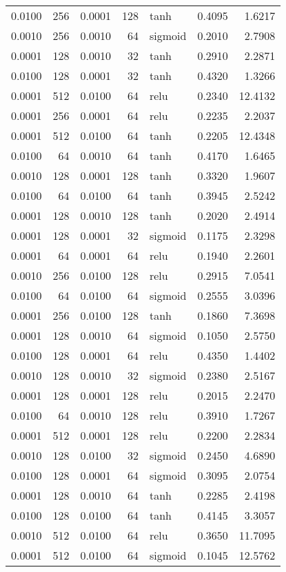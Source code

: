 \begin{table}
\begin{tabular}{rrrrlrr}
0.0100 & 256 & 0.0001 & 128 & tanh & 0.4095 & 1.6217 \\
0.0010 & 256 & 0.0010 & 64 & sigmoid & 0.2010 & 2.7908 \\
0.0001 & 128 & 0.0010 & 32 & tanh & 0.2910 & 2.2871 \\
0.0100 & 128 & 0.0001 & 32 & tanh & 0.4320 & 1.3266 \\
0.0001 & 512 & 0.0100 & 64 & relu & 0.2340 & 12.4132 \\
0.0001 & 256 & 0.0001 & 64 & relu & 0.2235 & 2.2037 \\
0.0001 & 512 & 0.0100 & 64 & tanh & 0.2205 & 12.4348 \\
0.0100 & 64 & 0.0010 & 64 & tanh & 0.4170 & 1.6465 \\
0.0010 & 128 & 0.0001 & 128 & tanh & 0.3320 & 1.9607 \\
0.0100 & 64 & 0.0100 & 64 & tanh & 0.3945 & 2.5242 \\
0.0001 & 128 & 0.0010 & 128 & tanh & 0.2020 & 2.4914 \\
0.0001 & 128 & 0.0001 & 32 & sigmoid & 0.1175 & 2.3298 \\
0.0001 & 64 & 0.0001 & 64 & relu & 0.1940 & 2.2601 \\
0.0010 & 256 & 0.0100 & 128 & relu & 0.2915 & 7.0541 \\
0.0100 & 64 & 0.0100 & 64 & sigmoid & 0.2555 & 3.0396 \\
0.0001 & 256 & 0.0100 & 128 & tanh & 0.1860 & 7.3698 \\
0.0001 & 128 & 0.0010 & 64 & sigmoid & 0.1050 & 2.5750 \\
0.0100 & 128 & 0.0001 & 64 & relu & 0.4350 & 1.4402 \\
0.0010 & 128 & 0.0010 & 32 & sigmoid & 0.2380 & 2.5167 \\
0.0001 & 128 & 0.0001 & 128 & relu & 0.2015 & 2.2470 \\
0.0100 & 64 & 0.0010 & 128 & relu & 0.3910 & 1.7267 \\
0.0001 & 512 & 0.0001 & 128 & relu & 0.2200 & 2.2834 \\
0.0010 & 128 & 0.0100 & 32 & sigmoid & 0.2450 & 4.6890 \\
0.0100 & 128 & 0.0001 & 64 & sigmoid & 0.3095 & 2.0754 \\
0.0001 & 128 & 0.0010 & 64 & tanh & 0.2285 & 2.4198 \\
0.0100 & 128 & 0.0100 & 64 & tanh & 0.4145 & 3.3057 \\
0.0010 & 512 & 0.0100 & 64 & relu & 0.3650 & 11.7095 \\
0.0001 & 512 & 0.0100 & 64 & sigmoid & 0.1045 & 12.5762 \\

\end{tabular}
\end{table}
